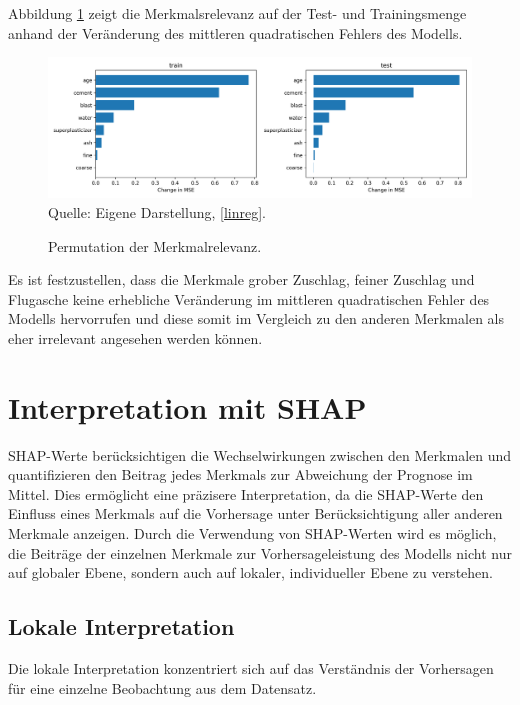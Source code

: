 Abbildung \ref{pic:permutation} zeigt die Merkmalsrelevanz auf der Test- und Trainingsmenge 
anhand der Veränderung des mittleren quadratischen Fehlers des Modells.

\begin{figure}[!h]
    \caption{Permutation der Merkmalrelevanz.}
    \includegraphics[width=1\textwidth]{../scripts/images/permutation_importance.png}
    Quelle: Eigene Darstellung, \ref{linreg}.
    \label{pic:permutation}
\end{figure}

Es ist festzustellen, dass die Merkmale grober Zuschlag, feiner Zuschlag und Flugasche keine erhebliche Veränderung im mittleren quadratischen
Fehler des Modells hervorrufen und diese somit im Vergleich zu den anderen Merkmalen als eher irrelevant angesehen werden können.

\section{Interpretation mit SHAP}

SHAP-Werte berücksichtigen die Wechselwirkungen zwischen den Merkmalen und 
quantifizieren den Beitrag jedes Merkmals zur Abweichung der Prognose im Mittel. 
Dies ermöglicht eine präzisere Interpretation, da die SHAP-Werte den Einfluss 
eines Merkmals auf die Vorhersage unter Berücksichtigung aller anderen Merkmale anzeigen. 
Durch die Verwendung von SHAP-Werten wird 
es möglich, die Beiträge der einzelnen Merkmale zur Vorhersageleistung des Modells nicht nur 
auf globaler Ebene, sondern auch auf lokaler, individueller Ebene zu verstehen. 

\subsection{Lokale Interpretation}

Die lokale Interpretation konzentriert sich auf das Verständnis der Vorhersagen 
für eine einzelne Beobachtung aus dem Datensatz.

